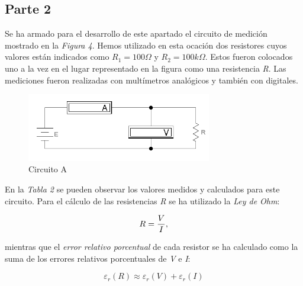 \documentclass{article}
\begin{document}
\subsection{Parte 2}


	Se ha armado para el desarrollo de este apartado el circuito de medición mostrado en la \textit{Figura 4}. Hemos utilizado en esta ocación dos resistores cuyos valores están indicados como \textit{$R_1=100\Omega$} y \textit{$R_2=100k\Omega$}. Estos fueron colocados uno a la vez en el lugar representado en la figura como una resistencia \textit{R}. Las mediciones fueron realizadas con multímetros analógicos y también con digitales.
\bigskip


\begin{figure}[h]
	\centering
	\includegraphics[width=0.72\textwidth]{images/p2-item-a.jpg}
	\caption{Circuito A}
\end{figure}
\bigskip\bigskip


\noindent En la \textit{Tabla 2} se pueden observar los valores medidos y calculados para este circuito. Para el cálculo de las resistencias \textit{R} se ha utilizado la \textit{Ley de Ohm}:
\medskip

\begin{equation}
 	R = {V \over I},
\end{equation}
\medskip

\noindent mientras que el \textit{error relativo porcentual} de cada resistor se ha calculado como la suma de los errores relativos porcentuales de \textit{V} e \textit{I}:
\medskip

\begin{equation}
 	\varepsilon_r(R) \approx \varepsilon_r(V) + \varepsilon_r(I)
\end{equation}
\bigskip
\end{document}
